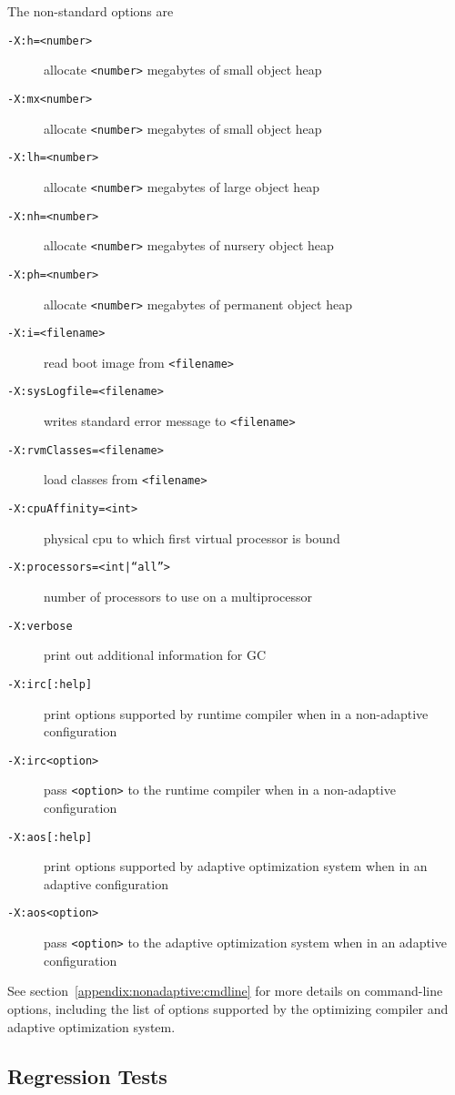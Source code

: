 The non-standard options are

\begin{description}
\item[{\tt -X:h=<number>}]
allocate {\tt <number>} megabytes of small object heap

\item[{\tt -X:mx<number>}]
allocate {\tt <number>} megabytes of small object heap

\item[{\tt -X:lh=<number>}]
allocate {\tt <number>} megabytes of large object heap

\item[{\tt -X:nh=<number>}]
allocate {\tt <number>} megabytes of nursery object heap 

\item[{\tt -X:ph=<number>}]
allocate {\tt <number>} megabytes of permanent object heap 

\item[{\tt -X:i=<filename>}]
read boot image from {\tt <filename>}

\item[{\tt -X:sysLogfile=<filename>}]
writes standard error message to {\tt <filename>}

\item[{\tt -X:rvmClasses=<filename>}]
load classes from {\tt <filename>}

\item[{\tt -X:cpuAffinity=<int>}]
physical cpu to which first virtual processor is bound

\item[{\tt -X:processors=<int|``all''>}]
number of processors to use on a multiprocessor

\item[{\tt -X:verbose}]
print out additional information for GC

\item[{\tt -X:irc[:help]}]
print options supported by runtime compiler when in a non-adaptive configuration 

\item[{\tt -X:irc<option>}]
pass {\tt <option>} to the runtime compiler when in a non-adaptive configuration 

\item[{\tt -X:aos[:help]}]
print options supported by adaptive optimization system when in an
adaptive configuration

\item[{\tt -X:aos<option>}]
pass {\tt <option>} to the adaptive optimization system when in an adaptive configuration

\end{description}

See section~\ref{appendix:nonadaptive:cmdline} for more details on 
command-line options, including the list of options supported by the 
optimizing compiler and adaptive optimization system.


\subsection{Regression Tests}


